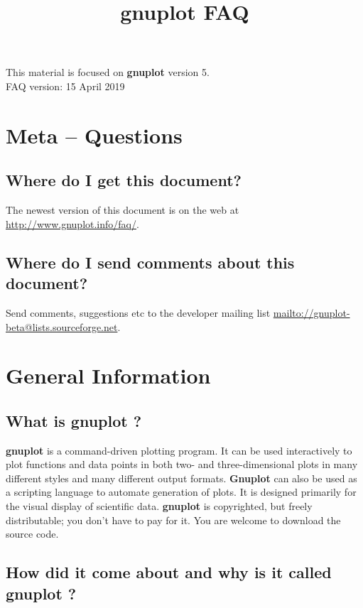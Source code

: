 \documentclass[a4paper,11pt]{article}
\def\http#1{{\small\href{http://#1}{\url{http://#1}}}}
\def\mailto#1{{\small\href{mailto://#1}{\url{mailto://#1}}}}
\newcommand{\mailto}[1]%
            {\htmladdnormallink{\latex{\url{<#1>}}\html{\textit{#1}}}%
                {mailto:#1}%
            }
\newcommand{\http}[1]%
            {\htmladdnormallink{\latex{\url{http://#1}}%
                    \html{\textit{http://#1}}}%
                {http://#1}%
            }
\newcommand{\gnuplot}{\textbf{gnuplot }}
\newcommand{\Gnuplot}{\textbf{Gnuplot }}
\begin{document}
\title{\gnuplot FAQ}
\author{}
\date{}
\maketitle

\noindent
This material is focused on \gnuplot version 5.
        \\
FAQ version: 15 April 2019


\tableofcontents


\setcounter{section}{-1}
\section{Meta -- Questions}

\subsection{Where do I get this document?}

The newest version of this document is on the web at
\http{www.gnuplot.info/faq/}.

\subsection{Where do I send comments about this document?}

Send comments, suggestions etc to the developer mailing list
\mailto{gnuplot-beta@lists.sourceforge.net}.

\section{General Information}

\subsection{What is \gnuplot?}

\gnuplot is a command-driven plotting program.
It can be used interactively to plot functions and data points in
both two- and three-dimensional plots in many different styles and
many different output formats.  \Gnuplot can also be used as a
scripting language to automate generation of plots.
It is designed primarily for the visual display of scientific data.
\gnuplot is copyrighted, but freely distributable;
you don't have to pay for it. You are welcome to download the source code.


\subsection{How did it come about and why is it called \gnuplot?}
\end{document}
